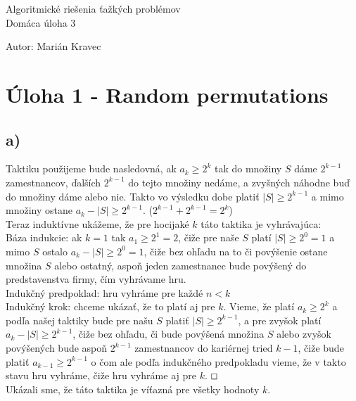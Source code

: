 \documentclass[a4paper]{article}
\begin{document}
 
	
\pagestyle{plain}

\begin{center}
	\sc\large
	Algoritmické riešenia ťažkých problémov\\
	Domáca úloha 3
\end{center}

Autor: Marián Kravec

\section{Úloha 1 -  Random permutations}

\subsection*{a)}

Taktiku použijeme bude nasledovná, ak $a_k \geq 2^k$ tak do množiny $S$ dáme $2^{k-1}$ zamestnancov, ďalších $2^{k-1}$ do tejto množiny nedáme, a zvyšných náhodne buď do množiny dáme alebo nie. Takto vo výsledku dobe platiť $|S| \geq 2^{k-1}$ a mimo množiny ostane $a_k - |S| \geq 2^{k-1}$. ($2^{k-1} + 2^{k-1} = 2^k$)
\\

Teraz induktívne ukážeme, že pre hocijaké $k$ táto taktika je vyhrávajúca:
\\

Báza indukcie: ak $k=1$ tak $a_1 \geq 2^1 = 2$, čiže pre naše $S$ platí $|S| \geq 2^0 = 1$ a mimo $S$ ostalo $a_k - |S| \geq 2^0 = 1$, čiže bez ohľadu na to či povýšenie ostane množina $S$ alebo ostatný, aspoň jeden zamestnanec bude povýšený do predstavenstva firmy, čím vyhrávame hru.
\\

Indukčný predpoklad: hru vyhráme pre každé $n<k$
\\

Indukčný krok: chceme ukázať, že to platí aj pre $k$. Vieme, že platí $a_k \geq 2^k$ a podľa našej taktiky bude pre našu $S$ platiť $|S| \geq 2^{k-1}$, a pre zvyšok platí $a_k - |S| \geq 2^{k-1}$, čiže bez ohľadu, či bude povýšená množina $S$ alebo zvyšok povýšených bude aspoň $2^{k-1}$ zamestnancov do kariérnej tried $k-1$, čiže bude platiť $a_{k-1} \geq 2^{k-1}$ o čom ale podľa indukčného predpokladu vieme, že v takto stavu hru vyhráme, čiže hru vyhráme aj pre $k$. $\oblong$
\\

Ukázali sme, že táto taktika je víťazná pre všetky hodnoty $k$.
\end{document}
